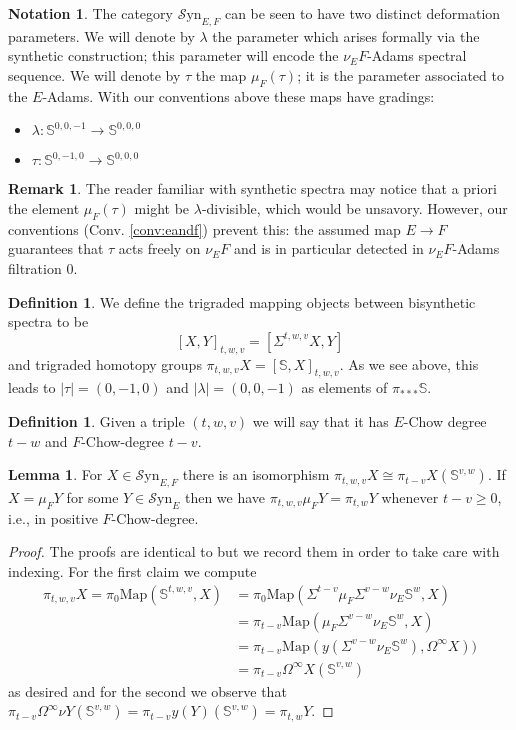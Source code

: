 \documentclass[10pt]{amsart}
\theoremstyle{definition}
\numberwithin{figure}{section}
\numberwithin{equation}{section}
\newtheorem{lemma}[figure]{Lemma}
\newtheorem{definition}[figure]{Definition}
\newtheorem{notation}[figure]{Notation}
\newtheorem{remark}[figure]{Remark}
\theoremstyle{cited}
\newcommand{\bS}{\mathbb{S}}
\newcommand{\Map}{\mathrm{Map}}
\newcommand{\Syn}{\mathcal{S}\mathrm{yn}}
\begin{document}
\begin{notation}
  The category $\Syn_{E,F}$ can be seen to have two distinct deformation parameters. We will denote by $\lambda$ the parameter which arises formally via the synthetic construction; this parameter will encode the $\nu_E F$-Adams spectral sequence. We will denote by $\tau$ the map $\mu_F(\tau)$; it is the parameter associated to the $E$-Adams. With our conventions above these maps have gradings:
  \begin{itemize}
    \item $\lambda:\bS^{0,0,-1}\to \bS^{0,0,0}$
    \item $\tau:\bS^{0,-1,0}\to \bS^{0,0,0}$
  \end{itemize}
\end{notation}

\begin{remark}
  The reader familiar with synthetic spectra may notice that a priori the element $\mu_F(\tau)$ might be $\lambda$-divisible, which would be unsavory. However, our conventions (Conv. \ref{conv:eandf}) prevent this: the assumed map $E\to F$ guarantees that $\tau$ acts freely on $\nu_E F$ and is in particular detected in $\nu_E F$-Adams filtration $0$.
\end{remark}

\begin{definition}
  We define the trigraded mapping objects between bisynthetic spectra to be
  \[
  [X,Y]_{t,w,v}=[\Sigma^{t,w,v}X, Y]
  \]
  and trigraded homotopy groups $\pi_{t,w,v}X=[\bS, X]_{t,w,v}$. As we see above, this leads to $|\tau|=(0,-1,0)$ and $|\lambda|=(0,0,-1)$ as elements of $\pi_{***}\bS$.
\end{definition}

\begin{definition}
  Given a triple $(t,w,v)$ we will say that it has $E$-Chow degree $t-w$ and $F$-Chow-degree $t-v$.
\end{definition}

\begin{lemma}\label{homotopyfchow}
  For $X\in \Syn_{E,F}$ there is an isomorphism $\pi_{t,w,v} X \cong \pi_{t-v}X(\bS^{v,w})$. If $X=\mu_F Y$ for some $Y\in \Syn_{E}$ then we have $\pi_{t,w,v}\mu_F Y = \pi_{t,w} Y$ whenever $t-v\geq 0$, i.e., in positive $F$-Chow-degree.
\end{lemma}

\begin{proof}
  The proofs are identical to \cite[Lem. 4.11, Cor. 4.12]{Pst22} but we record them in order to take care with indexing. For the first claim we compute
  \begin{align*}
    \pi_{t,w,v}X = \pi_0\Map(\bS^{t,w,v}, X) &= \pi_{0}\Map(\Sigma^{t-v}\mu_F\Sigma^{v-w}\nu_E\bS^w, X)\\
    &= \pi_{t-v}\Map(\mu_F\Sigma^{v-w}\nu_E\bS^w, X)\\
    &= \pi_{t-v}\Map(y(\Sigma^{v-w}\nu_E\bS^w), \Omega^\infty X))\\
    &= \pi_{t-v}\Omega^\infty X(\bS^{v,w})
  \end{align*}
  as desired and for the second we observe that $\pi_{t-v}\Omega^\infty\nu Y(\bS^{v,w})=\pi_{t-v}y(Y)(\bS^{v,w})=\pi_{t,w}Y$.
\end{proof}
\end{document}
